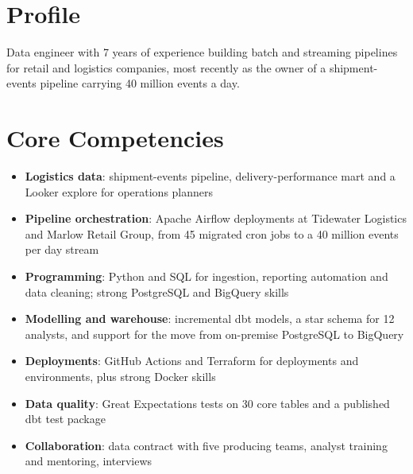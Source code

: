 \documentclass[11pt,a4paper,sans]{moderncv}
\begin{document}
\makecvtitle

\section{Profile}
Data engineer with 7 years of experience building batch and streaming pipelines for retail and logistics
companies, most recently as the owner of a shipment-events pipeline carrying 40 million events a day.

\section{Core Competencies}
\begin{itemize}
  \item \textbf{Logistics data}: shipment-events pipeline, delivery-performance mart and a Looker explore for operations planners
  \item \textbf{Pipeline orchestration}: Apache Airflow deployments at Tidewater Logistics and Marlow Retail Group,
    from 45 migrated cron jobs to a 40 million events per day stream
  \item \textbf{Programming}: Python and SQL for ingestion, reporting automation and data cleaning; strong
    PostgreSQL and BigQuery skills
  \item \textbf{Modelling and warehouse}: incremental dbt models, a star schema for 12 analysts, and support for the
    move from on-premise PostgreSQL to BigQuery
  \item \textbf{Deployments}: GitHub Actions and Terraform for deployments and environments, plus strong Docker skills
  \item \textbf{Data quality}: Great Expectations tests on 30 core tables and a published dbt test package
  \item \textbf{Collaboration}: data contract with five producing teams, analyst training and mentoring, interviews
\end{itemize}
\end{document}
